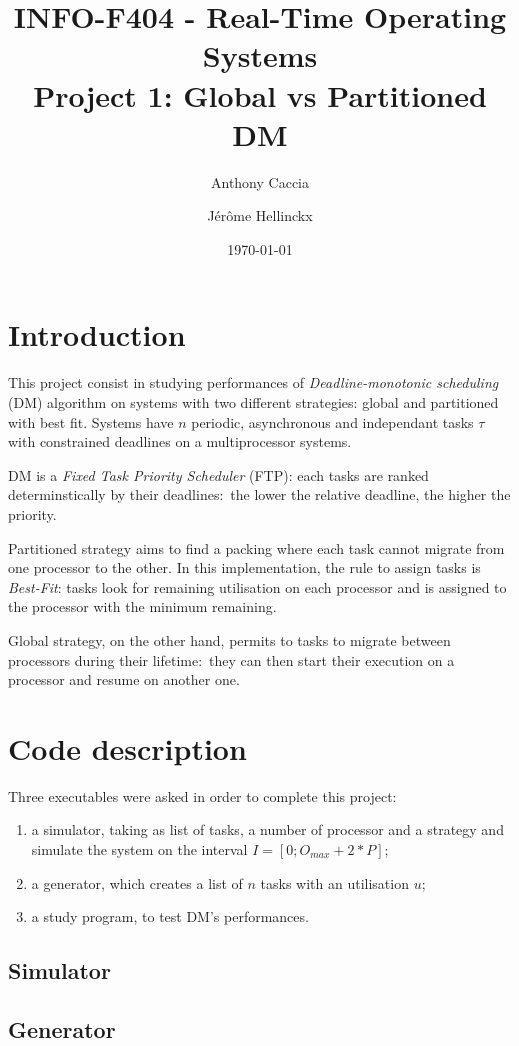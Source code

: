 \documentclass{scrartcl}
\title{INFO-F404 - Real-Time Operating Systems\\Project 1: Global vs Partitioned DM}
\author{Anthony Caccia \and J\'{e}r\^{o}me Hellinckx}
\date{\today}
\begin{document}
\maketitle

\section{Introduction}
This project consist in studying performances of \emph{Deadline-monotonic scheduling} (DM) algorithm on systems with two different strategies: global and partitioned with best fit. Systems have $n$ periodic, asynchronous and independant tasks $\tau$ with constrained deadlines on a multiprocessor systems.

DM is a \emph{Fixed Task Priority Scheduler} (FTP): each tasks are ranked determinstically by their deadlines: the lower the relative deadline, the higher the priority.

Partitioned strategy aims to find a packing where each task cannot migrate from one processor to the other. In this implementation, the rule to assign tasks is \emph{Best-Fit}: tasks look for remaining utilisation on each processor and is assigned to the processor with the minimum remaining.

Global strategy, on the other hand, permits to tasks to migrate between processors during their lifetime: they can then start their execution on a processor and resume on another one.

\section{Code description}
Three executables were asked in order to complete this project:
\begin{enumerate}
  \item a simulator, taking as list of tasks, a number of processor and a strategy and simulate the system on the interval $I = [0; O_{max} + 2 * P]$;
  \item a generator, which creates a list of $n$ tasks with an utilisation $u$;
  \item a study program, to test DM's performances.
\end{enumerate}

\subsection{Simulator}

\subsection{Generator}
\end{document}
